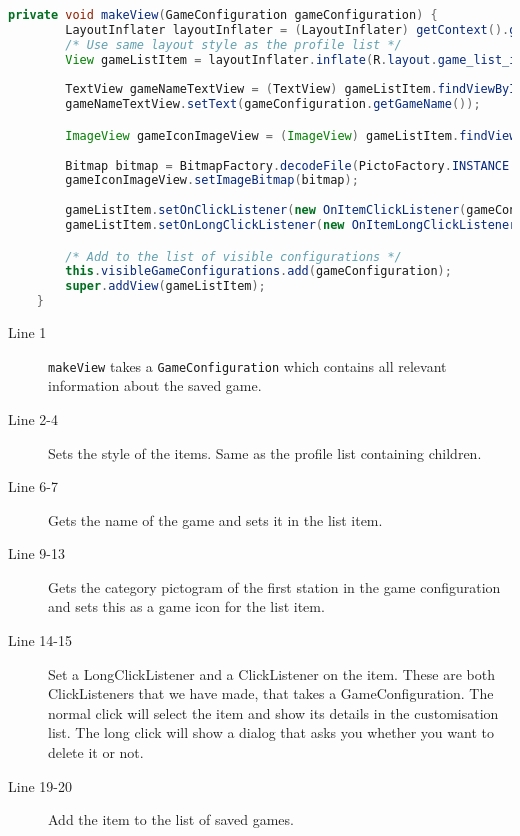 \begin{lstlisting}[language=java,firstnumber=1,caption={The method to create a list item},label=lst:makeview]
private void makeView(GameConfiguration gameConfiguration) {
        LayoutInflater layoutInflater = (LayoutInflater) getContext().getSystemService(Context.LAYOUT_INFLATER_SERVICE);
        /* Use same layout style as the profile list */
        View gameListItem = layoutInflater.inflate(R.layout.game_list_item, null);
        
        TextView gameNameTextView = (TextView) gameListItem.findViewById(R.id.gameName);
        gameNameTextView.setText(gameConfiguration.getGameName());

        ImageView gameIconImageView = (ImageView) gameListItem.findViewById(R.id.gameIcon);
        
        Bitmap bitmap = BitmapFactory.decodeFile(PictoFactory.INSTANCE.getPictogram(super.getContext(),gameConfiguration.getStation(0).getCategory()).getImagePath());
        gameIconImageView.setImageBitmap(bitmap);
        
        gameListItem.setOnClickListener(new OnItemClickListener(gameConfiguration));
        gameListItem.setOnLongClickListener(new OnItemLongClickListener(gameConfiguration));

        /* Add to the list of visible configurations */
        this.visibleGameConfigurations.add(gameConfiguration);
        super.addView(gameListItem);
    }
\end{lstlisting}
\begin{description}
\item[Line 1] \lstinline|makeView| takes a \lstinline|GameConfiguration| which contains all relevant information about the saved game.
\item[Line 2-4] Sets the style of the items. Same as the profile list containing children.
\item[Line 6-7] Gets the name of the game and sets it in the list item.
\item[Line 9-13] Gets the category pictogram of the first station in the game configuration and sets this as a game icon for the list item.
\item[Line 14-15] Set a LongClickListener and a ClickListener on the item. These are both ClickListeners that we have made, that takes a GameConfiguration. The normal click will select the item and show its details in the customisation list. The long click will show a dialog that asks you whether you want to delete it or not. 
\item[Line 19-20] Add the item to the list of saved games.
\end{description}

